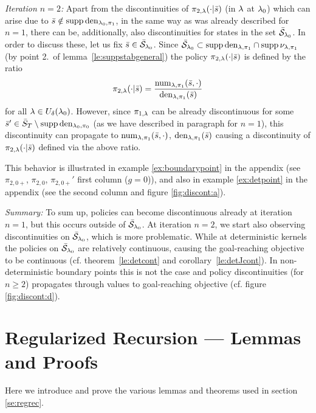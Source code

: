 \emph{Iteration $n=2$:}
Apart from the discontinuities of $\pi_{2,\mathit{\lambda}}(\cdot|\bar{s})$ (in $\mathit{\lambda}$ at $\mathit{\lambda}_0$) which can arise due to $\bar{s}\notin\operatorname*{\mathrm{supp}}\mathrm{den}_{\mathit{\lambda}_0,\pi_1}$, in the same way as was already described for $n=1$, there can be, additionally, also discontinuities for states in the set $\bar{\mathcal{S}}_{\mathit{\lambda}_0}$. In order to discuss these, let us fix $\bar{s}\in\bar{\mathcal{S}}_{\mathit{\lambda}_0}$. Since $\bar{\mathcal{S}}_{\mathit{\lambda}_0}\subset \operatorname*{\mathrm{supp}}\mathrm{den}_{\mathit{\lambda},\pi_1}\cap\operatorname*{\mathrm{supp}}\nu_{\mathit{\lambda},\pi_1}$ (by point 2.\ of lemma~\ref{le:suppstabgeneral}) the policy $\pi_{2,\mathit{\lambda}}(\cdot|\bar{s})$ is defined by the ratio
$$
\pi_{2,\mathit{\lambda}}(\cdot|\bar{s})
=
\frac{\mathrm{num}_{\mathit{\lambda},\pi_1}(\bar{s},\cdot)}{\mathrm{den}_{\mathit{\lambda},\pi_1}(\bar{s})}
$$
for all $\mathit{\lambda}\in U_{\delta}(\mathit{\lambda}_0)$.
However, since $\pi_{1,\mathit{\lambda}}$ can be already discontinuous for some $\bar{s}'\in\bar{S}_T\setminus \operatorname*{\mathrm{supp}}\mathrm{den}_{\mathit{\lambda}_0,\pi_0}$ (as we have described in paragraph for $n=1$), this discontinuity can propagate to $\mathrm{num}_{\mathit{\lambda},\pi_1}(\bar{s},\cdot)$, $\mathrm{den}_{\mathit{\lambda},\pi_1}(\bar{s})$ 
causing a discontinuity of $\pi_{2,\mathit{\lambda}}(\cdot|\bar{s})$
defined via the above ratio.

This behavior is illustrated in example \ref{ex:boundarypoint} in the appendix (see $\pi_{2,0+}$, $\pi_{2,0}$, $\pi_{2,0+}'$ first column ($g=0$)),
and also in example \ref{ex:detpoint} in the appendix (see the second column and figure \ref{fig:discont:a}).


\emph{Summary:}
To sum up, policies can become discontinuous already at
iteration $n=1$, but this occurs outside of $\bar{\mathcal{S}}_{\mathit{\lambda}_0}$. At iteration $n=2$, we start also observing discontinuities on $\bar{\mathcal{S}}_{\mathit{\lambda}_0}$,
which is more problematic.
While at deterministic kernels the policies
on $\bar{\mathcal{S}}_{\mathit{\lambda}_0}$ are relatively continuous,
causing the goal-reaching objective to be continuous
(cf. theorem~\ref{le:detcont} and corollary~\ref{le:detJcont}). In
non-deterministic boundary points this is not the case
and policy discontinuities (for $n\geq 2$) propagates through values
to goal-reaching objective (cf. figure \ref{fig:discont:d}).





\section{Regularized Recursion --- Lemmas and Proofs}
\label{ap:regrec}

Here we introduce and prove the various lemmas and theorems used in section \ref{se:regrec}.

